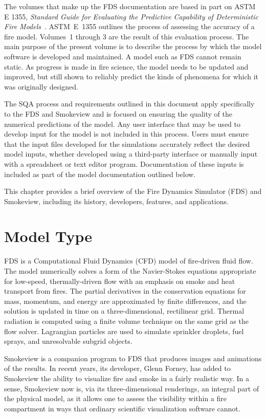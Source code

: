 \documentclass[11pt]{book}
\begin{document}
The volumes that make up the FDS documentation are based in part on ASTM E 1355, {\em Standard Guide for Evaluating the Predictive Capability of Deterministic Fire Models}~\cite{ASTM:E1355}. ASTM~E~1355 outlines the process of assessing the accuracy of a fire model. Volumes~1 through 3 are the result of this evaluation process. The main purpose of the present volume is to describe the process by which the model software is developed and maintained. A model such as FDS cannot remain static. As progress is made in fire science, the model needs to be updated and improved, but still shown to reliably predict the kinds of phenomena for which it was originally designed.

The SQA process and requirements outlined in this document apply specifically to the FDS and Smokeview and is focused on ensuring the quality of the numerical predictions of the model.  Any user interface that may be used to develop input for the model is not included in this process. Users must ensure that the input files developed for the simulations accurately reflect the desired model inputs, whether developed using a third-party interface or manually input with a spreadsheet or text editor program.  Documentation of these inputs is included as part of the model documentation outlined below.

This chapter provides a brief overview of the Fire Dynamics Simulator (FDS) and Smokeview, including its history, developers, features, and applications.


\section{Model Type}

FDS is a Computational Fluid Dynamics (CFD) model of fire-driven fluid flow. The model numerically solves a form of the Navier-Stokes equations
appropriate for low-speed, thermally-driven flow with an emphasis on smoke and heat transport from fires. The partial derivatives in the conservation
equations for mass, momentum, and energy are approximated by finite differences, and the solution is updated in time on a three-dimensional,
rectilinear grid. Thermal radiation is computed using a finite volume technique on the same grid as the flow solver. Lagrangian particles are used to
simulate sprinkler droplets, fuel sprays, and unresolvable subgrid objects.

Smokeview is a companion program to FDS that produces images and animations of the results. In recent years, its developer, Glenn Forney, has added
to Smokeview the ability to visualize fire and smoke in a fairly realistic way. In a sense, Smokeview now is, via its three-dimensional renderings,
an integral part of the physical model, as it allows one to assess the visibility within a fire compartment in ways that ordinary scientific
visualization software cannot.
\end{document}
